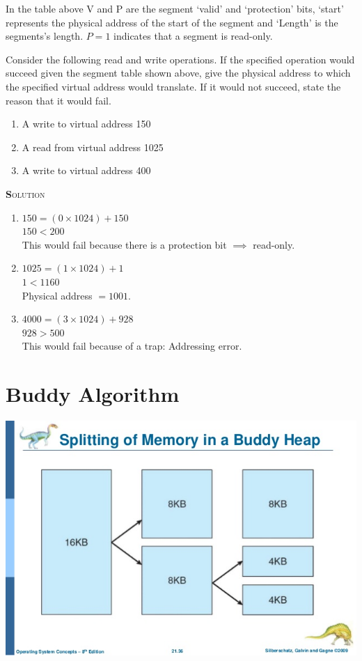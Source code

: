 \documentclass{article}
\newcommand{\smallcaps}[1]{\textsc{\textbf #1}\\}
\begin{document}
\begin{multicols}{2}
    In the table above V and P are the segment `valid' and `protection' bits, `start' represents the
    physical address of the start of the segment and `Length' is the segments's length. $P = 1$
    indicates that a segment is read-only.

    Consider the following read and write operations. If the specified operation would succeed given
    the segment table shown above, give the physical address to which the specified virtual address
    would translate. If it would not succeed, state the reason that it would fail.

    \begin{enumerate}
      \item A write to virtual address 150
      \item A read from virtual address 1025
      \item A write to virtual address 400
    \end{enumerate}

    \smallcaps{Solution}

    \begin{enumerate}
      \item
        $150 = (0 \times 1024) + 150$ \\
        $150 < 200$ \\
        This would fail because there is a protection bit $\implies$ read-only.
      \item
        $1025 = (1 \times 1024) + 1$ \\
        $1 < 1160$ \\
        Physical address $= 1001$.
      \item
        $4000 = (3 \times 1024) + 928$ \\
        $928 > 500$ \\
        This would fail because of a trap: Addressing error.
    \end{enumerate}

    \section*{Buddy Algorithm}
    \begin{center}
      \includegraphics[scale=0.4]{buddy_algorithm.png} \\
    \end{center}


\end{multicols}
\end{document}

